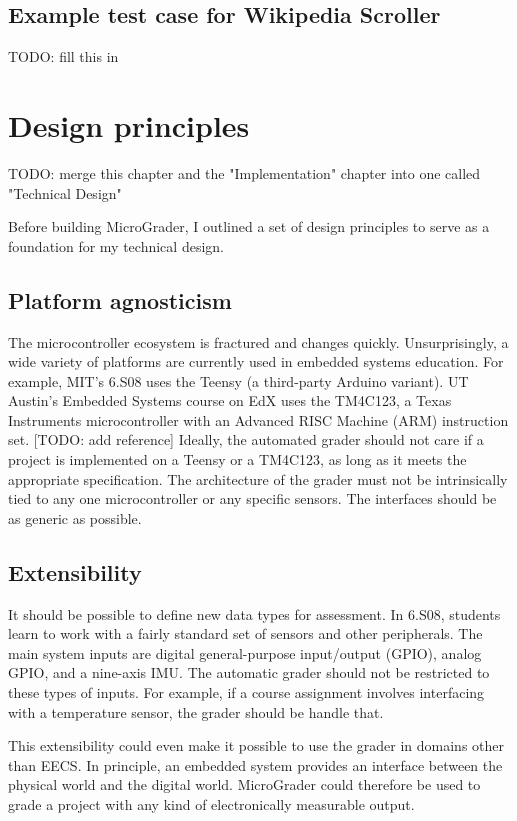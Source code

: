 \documentclass[12pt]{article}
\begin{document}
\subsection{Example test case for Wikipedia Scroller}
TODO: fill this in

\newpage
\section{Design principles}
TODO: merge this chapter and the "Implementation" chapter into one called "Technical Design"

Before building MicroGrader, I outlined a set of design principles to serve as a foundation for my technical design.

\subsection{Platform agnosticism}
The microcontroller ecosystem is fractured and changes quickly.  Unsurprisingly, a wide variety of platforms are currently used in embedded systems education.  For example, MIT's 6.S08 uses the Teensy (a third-party Arduino variant).  UT Austin's Embedded Systems course on EdX uses the TM4C123, a Texas Instruments microcontroller with an Advanced RISC Machine (ARM) instruction set. [TODO: add reference]  Ideally, the automated grader should not care if a project is implemented on a Teensy or a TM4C123, as long as it meets the appropriate specification. The architecture of the grader must not be intrinsically tied to any one microcontroller or any specific sensors.  The interfaces should be as generic as possible.

\subsection{Extensibility}
It should be possible to define new data types for assessment.  In 6.S08, students learn to work with a fairly standard set of sensors and other peripherals.  The main system inputs are digital general-purpose input/output (GPIO), analog GPIO, and a nine-axis IMU.  The automatic grader should not be restricted to these types of inputs.  For example, if a course assignment involves interfacing with a temperature sensor, the grader should be handle that.

This extensibility could even make it possible to use the grader in domains other than EECS.  In principle, an embedded system provides an interface between the physical world and the digital world.  MicroGrader could therefore be used to grade a project with any kind of electronically measurable output.
\end{document}
